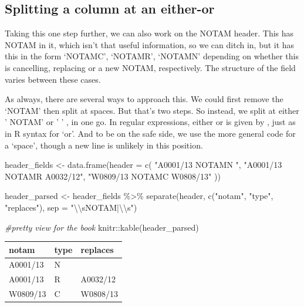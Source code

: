 \documentclass[
]{book}
\newenvironment{Shaded}{\begin{snugshade}}{\end{snugshade}}
\newcommand{\AttributeTok}[1]{\textcolor[rgb]{0.77,0.63,0.00}{#1}}
\newcommand{\CommentTok}[1]{\textcolor[rgb]{0.56,0.35,0.01}{\textit{#1}}}
\newcommand{\FunctionTok}[1]{\textcolor[rgb]{0.00,0.00,0.00}{#1}}
\newcommand{\NormalTok}[1]{#1}
\newcommand{\OtherTok}[1]{\textcolor[rgb]{0.56,0.35,0.01}{#1}}
\newcommand{\SpecialCharTok}[1]{\textcolor[rgb]{0.00,0.00,0.00}{#1}}
\newcommand{\StringTok}[1]{\textcolor[rgb]{0.31,0.60,0.02}{#1}}
\begin{document}
\hypertarget{splitting-a-column-at-an-either-or}{%
\subsection{Splitting a column at an either-or}\label{splitting-a-column-at-an-either-or}}

Taking this one step further, we can also work on the NOTAM header. This has NOTAM in it, which isn't that useful information, so we can ditch in, but it has this in the form `NOTAMC', `NOTAMR', `NOTAMN' depending on whether this is cancelling, replacing or a new NOTAM, respectively. The structure of the field varies between these cases.

As always, there are several ways to approach this. We could first remove the `NOTAM' then split at spaces. But that's two steps. So instead, we split at either ' NOTAM' or ' ' , in one go. In regular expressions, either or is given by \texttt{\textbar{}}, just as in R syntax for `or'. And to be on the safe side, we use the more general code for a `space', though a new line is unlikely in this position.

\begin{Shaded}
\begin{Highlighting}[]
\NormalTok{header\_fields }\OtherTok{\textless{}{-}} \FunctionTok{data.frame}\NormalTok{(}\AttributeTok{header =} \FunctionTok{c}\NormalTok{(}
  \StringTok{"A0001/13 NOTAMN "}\NormalTok{,}
  \StringTok{"A0001/13 NOTAMR A0032/12"}\NormalTok{,}
  \StringTok{"W0809/13 NOTAMC W0808/13"}
\NormalTok{))}

\NormalTok{header\_parsed }\OtherTok{\textless{}{-}}\NormalTok{ header\_fields }\SpecialCharTok{\%\textgreater{}\%} 
  \FunctionTok{separate}\NormalTok{(header,}
           \FunctionTok{c}\NormalTok{(}\StringTok{"notam"}\NormalTok{, }\StringTok{"type"}\NormalTok{, }\StringTok{"replaces"}\NormalTok{),}
           \AttributeTok{sep =} \StringTok{"}\SpecialCharTok{\textbackslash{}\textbackslash{}}\StringTok{sNOTAM|}\SpecialCharTok{\textbackslash{}\textbackslash{}}\StringTok{s"}\NormalTok{)}

\CommentTok{\#pretty view for the book}
\NormalTok{knitr}\SpecialCharTok{::}\FunctionTok{kable}\NormalTok{(header\_parsed)}
\end{Highlighting}
\end{Shaded}

\begin{tabular}{l|l|l}
\hline
notam & type & replaces\\
\hline
A0001/13 & N & \\
\hline
A0001/13 & R & A0032/12\\
\hline
W0809/13 & C & W0808/13\\
\hline
\end{tabular}
\end{document}
